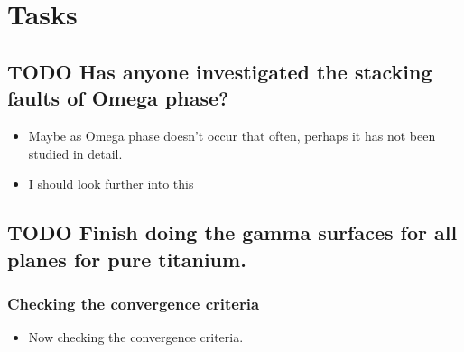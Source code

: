 \documentclass[11pt]{article}
\author{Tigany}
\date{\today}
\title{}
\begin{document}
\tableofcontents




\section{Tasks}
\label{sec:orgca4f6c1}

\subsection{{\bfseries\sffamily TODO} Has anyone investigated the stacking faults of Omega phase?}
\label{sec:org921a015}
\begin{itemize}
\item Maybe as Omega phase doesn't occur that often, perhaps it has not been
studied in detail.
\item I should look further into this
\end{itemize}
\subsection{{\bfseries\sffamily TODO} Finish doing the gamma surfaces for all planes for pure titanium.}
\label{sec:org5ed5e38}
\subsubsection{Checking the convergence criteria}
\label{sec:orgfdf205b}
\begin{itemize}
\item Now checking the convergence criteria.
\end{itemize}
\end{document}
